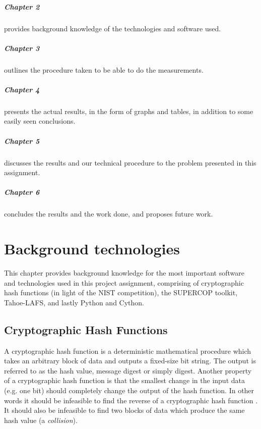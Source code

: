 \documentclass[english,12pt,a4paper]{book}
\begin{document}
\paragraph{Chapter 2} provides background knowledge of the technologies and
software used.

\paragraph{Chapter 3} outlines the procedure taken to be able to do the
measurements.

\paragraph{Chapter 4} presents the actual results, in the form of graphs and
tables, in addition to some easily seen conclusions.

\paragraph{Chapter 5} discusses the results and our technical procedure to the
problem presented in this assignment.

\paragraph{Chapter 6} concludes the results and the work done, and proposes
future work.


\chapter{Background technologies}

This chapter provides background knowledge for the most important software and
technologies used in this project assignment, comprising of cryptographic hash
functions (in light of the \ac{NIST} competition), the \ac{SUPERCOP} toolkit,
Tahoe-\ac{LAFS}, and lastly Python and Cython.

\section{Cryptographic Hash Functions}

A cryptographic hash function is a deterministic mathematical procedure which
takes an arbitrary block of data and outputs a fixed-size bit string. The output
is referred to as the hash value, message digest or simply digest.
Another property of a cryptographic hash function is that the smallest change in
the input data (e.g. one bit) should completely change the output of the hash
function. In other words it should be infeasible to find the reverse of a
cryptographic hash function \cite[p. 335]{stallings}. It should also be infeasible to
find two blocks of data which produce the same hash value (a \emph{collision}).
\end{document}
